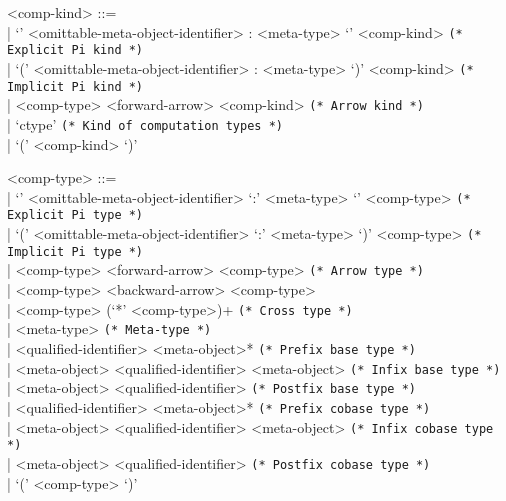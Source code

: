 \documentclass[11pt]{article}
\begin{document}
\begin{grammar}
<comp-kind> ::= \hfill\\
| `{' <omittable-meta-object-identifier> : <meta-type> `}' <comp-kind> \hfill \texttt{(* Explicit Pi kind *)}\\
| `(' <omittable-meta-object-identifier> : <meta-type> `)' <comp-kind> \hfill \texttt{(* Implicit Pi kind *)}\\
| <comp-type> <forward-arrow> <comp-kind> \hfill \texttt{(* Arrow kind *)}\\
| `ctype' \hfill \texttt{(* Kind of computation types *)}\\
| `(' <comp-kind> `)'

<comp-type> ::= \hfill\\
| `{' <omittable-meta-object-identifier> `:' <meta-type> `}' <comp-type> \hfill \texttt{(* Explicit Pi type *)}\\
| `(' <omittable-meta-object-identifier> `:' <meta-type> `)' <comp-type> \hfill \texttt{(* Implicit Pi type *)}\\
| <comp-type> <forward-arrow> <comp-type> \hfill \texttt{(* Arrow type *)}\\
| <comp-type> <backward-arrow> <comp-type>\\
| <comp-type> (`*' <comp-type>)+ \hfill \texttt{(* Cross type *)}\\
| <meta-type> \hfill \texttt{(* Meta-type *)}\\
| <qualified-identifier> <meta-object>* \hfill \texttt{(* Prefix base type *)}\\
| <meta-object> <qualified-identifier> <meta-object> \hfill \texttt{(* Infix base type *)}\\
| <meta-object> <qualified-identifier> \hfill \texttt{(* Postfix base type *)}\\
| <qualified-identifier> <meta-object>* \hfill \texttt{(* Prefix cobase type *)}\\
| <meta-object> <qualified-identifier> <meta-object> \hfill \texttt{(* Infix cobase type *)}\\
| <meta-object> <qualified-identifier> \hfill \texttt{(* Postfix cobase type *)}\\
| `(' <comp-type> `)'


\end{grammar}
\end{document}
